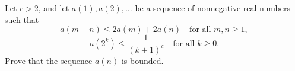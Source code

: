 Let $c > 2$, and let $a(1), a(2), \ldots$ be a sequence of nonnegative real numbers such that
\[ a(m + n) \leq 2a(m) + 2a(n) \quad \text{for all } m, n \geq 1, \tag{1} \]
\[ a\!\left(2^{k}\right) \leq \frac{1}{(k + 1)^{c}} \quad \text{for all } k \geq 0. \tag{2} \]
Prove that the sequence $a(n)$ is bounded.

